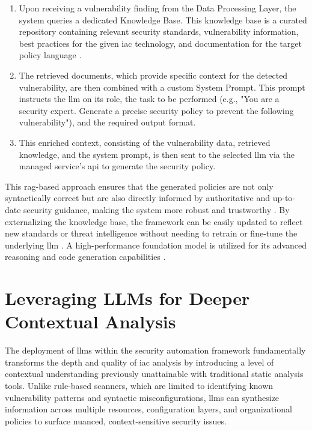 \begin{enumerate}
\item Upon receiving a vulnerability finding from the Data Processing Layer, the system queries a dedicated Knowledge Base. This knowledge base is a curated repository containing relevant security standards, vulnerability information, best practices for the given \gls{iac} technology, and documentation for the target policy language \cite{ozgur_simple_2024}.
\item The retrieved documents, which provide specific context for the detected vulnerability, are then combined with a custom System Prompt. This prompt instructs the \gls{llm} on its role, the task to be performed (e.g., "You are a security expert. Generate a precise security policy to prevent the following vulnerability"), and the required output format.
\item This enriched context, consisting of the vulnerability data, retrieved knowledge, and the system prompt, is then sent to the selected \gls{llm} via the managed service's \gls{api} to generate the security policy.
\end{enumerate}

This \gls{rag}-based approach ensures that the generated policies are not only syntactically correct but are also directly informed by authoritative and up-to-date security guidance, making the system more robust and trustworthy \cite{noauthor_ground_nodate}. By externalizing the knowledge base, the framework can be easily updated to reflect new standards or threat intelligence without needing to retrain or fine-tune the underlying \gls{llm} \cite{ozgur_simple_2024}. A high-performance foundation model is utilized for its advanced reasoning and code generation capabilities .


\section{Leveraging LLMs for Deeper Contextual Analysis} %
\label{sec:Leveraging LLMs for Deeper Contextual Analysis}

The deployment of \glspl{llm} within the security automation framework fundamentally transforms the depth and quality of \gls{iac} analysis by introducing a level of contextual understanding previously unattainable with traditional static analysis tools. Unlike rule-based scanners, which are limited to identifying known vulnerability patterns and syntactic misconfigurations, \glspl{llm} can synthesize information across multiple resources, configuration layers, and organizational policies to surface nuanced, context-sensitive security issues.

